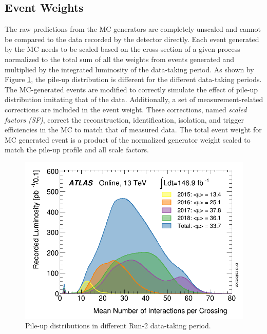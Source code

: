\subsection{Event Weights}
\label{subsec:EventWt}

The raw predictions from the MC generators are completely unscaled and cannot be compared to the data recorded by the detector directly. Each event generated by the MC needs to be scaled based on the cross-section of a given process normalized to the total sum of all the weights from events generated and multiplied by the integrated luminosity of the data-taking period. As shown by Figure \ref{fig:PileupDiffRuns}, the pile-up distribution is different for the different data-taking periods. The MC-generated events are modified to correctly simulate the effect of pile-up distribution imitating that of the data. Additionally, a set of measurement-related corrections are included in the event weight. These corrections, named \textit{ scaled factors (SF)}, correct the reconstruction, identification, isolation, and trigger efficiencies in the MC to match that of measured data. The total event weight for MC generated event is a product of the normalized generator weight scaled to match the pile-up profile and all scale factors.

\begin{figure}
\centering
\includegraphics[width=.8\linewidth]{figures/AnalysisOverview/mu_ProfileRun2.pdf}
\caption{Pile-up distributions in different Run-2 data-taking period.\label{fig:PileupDiffRuns} \cite{ATLASRun2DataTaking}}
\end{figure}

